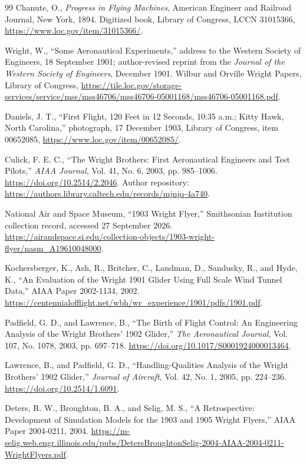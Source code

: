 \documentclass[10pt,letterpaper]{article}
\begin{document}
\begingroup\raggedright
\begin{thebibliography}{99}
 Chanute, O., \emph{Progress in Flying Machines}, American Engineer and Railroad Journal, New York, 1894. Digitized book, Library of Congress, LCCN 31015366, \url{https://www.loc.gov/item/31015366/}.

 Wright, W., ``Some Aeronautical Experiments,'' address to the Western Society of Engineers, 18 September 1901; author-revised reprint from the \emph{Journal of the Western Society of Engineers}, December 1901. Wilbur and Orville Wright Papers, Library of Congress, \url{https://tile.loc.gov/storage-services/service/mss/mss46706/mss46706-05001168/mss46706-05001168.pdf}.

 Daniels, J. T., ``First Flight, 120 Feet in 12 Seconds, 10:35 a.m.; Kitty Hawk, North Carolina,'' photograph, 17 December 1903, Library of Congress, item 00652085, \url{https://www.loc.gov/item/00652085/}.

 Culick, F. E. C., ``The Wright Brothers: First Aeronautical Engineers and Test Pilots,'' \emph{AIAA Journal}, Vol. 41, No. 6, 2003, pp. 985--1006. \url{https://doi.org/10.2514/2.2046}. Author repository: \url{https://authors.library.caltech.edu/records/mjnjq-4a740}.

 National Air and Space Museum, ``1903 Wright Flyer,'' Smithsonian Institution collection record, accessed 27 September 2026. \url{https://airandspace.si.edu/collection-objects/1903-wright-flyer/nasm_A19610048000}.

 Kochersberger, K., Ash, R., Britcher, C., Landman, D., Sandusky, R., and Hyde, K., ``An Evaluation of the Wright 1901 Glider Using Full Scale Wind Tunnel Data,'' AIAA Paper 2002-1134, 2002. \url{https://centennialofflight.net/wbh/wr_experience/1901/pdfs/1901.pdf}.

 Padfield, G. D., and Lawrence, B., ``The Birth of Flight Control: An Engineering Analysis of the Wright Brothers' 1902 Glider,'' \emph{The Aeronautical Journal}, Vol. 107, No. 1078, 2003, pp. 697--718. \url{https://doi.org/10.1017/S0001924000013464}.

 Lawrence, B., and Padfield, G. D., ``Handling-Qualities Analysis of the Wright Brothers' 1902 Glider,'' \emph{Journal of Aircraft}, Vol. 42, No. 1, 2005, pp. 224--236. \url{https://doi.org/10.2514/1.6091}.

 Deters, R. W., Broughton, B. A., and Selig, M. S., ``A Retrospective: Development of Simulation Models for the 1903 and 1905 Wright Flyers,'' AIAA Paper 2004-0211, 2004. \url{https://m-selig.web.engr.illinois.edu/pubs/DetersBroughtonSelig-2004-AIAA-2004-0211-WrightFlyers.pdf}.


\end{thebibliography}
\end{document}
